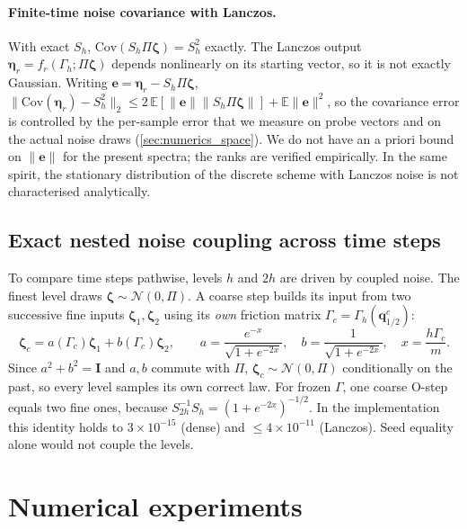 \documentclass[11pt]{article}
\DeclareRobustCommand{\_}{\textunderscore\allowbreak}
\theoremstyle{remark}
\theoremstyle{definition}
\newcommand{\bq}{\mathbf{q}}
\newcommand{\Id}{\mathbf{I}}
\newcommand{\Gh}{\Gamma_h}
\begin{document}
\paragraph{Finite-time noise covariance with Lanczos.}
With exact $S_h$, $\mathrm{Cov}(S_h\Pi\boldsymbol\zeta)=S_h^2$ exactly. The Lanczos output
$\boldsymbol\eta_r=f_r(\Gh;\Pi\boldsymbol\zeta)$ depends nonlinearly on its starting vector, so it is not exactly Gaussian.
Writing $\mathbf e=\boldsymbol\eta_r-S_h\Pi\boldsymbol\zeta$,
$\|\mathrm{Cov}(\boldsymbol\eta_r)-S_h^2\|_2\le2\,\mathbb E[\|\mathbf e\|\|S_h\Pi\boldsymbol\zeta\|]+\mathbb E\|\mathbf e\|^2$,
so the covariance error is controlled by the per-sample error that we measure on probe vectors and on the actual
noise draws (\cref{sec:numerics_space}). We do not have an a priori bound on $\|\mathbf e\|$ for the present spectra;
the ranks are verified empirically. In the same spirit, the stationary distribution of the discrete scheme with
Lanczos noise is not characterised analytically.

\subsection{Exact nested noise coupling across time steps}\label{sec:coupling}

To compare time steps pathwise, levels $h$ and $2h$ are driven by coupled noise. The finest level draws
$\boldsymbol\zeta\sim\mathcal N(0,\Pi)$. A coarse step builds its input from two successive fine inputs
$\boldsymbol\zeta_1,\boldsymbol\zeta_2$ using its \emph{own} friction matrix $\Gamma_c=\Gh(\bq^{c}_{1/2})$:
\begin{equation}\label{eq:coupling}
\boldsymbol\zeta_c=a(\Gamma_c)\boldsymbol\zeta_1+b(\Gamma_c)\boldsymbol\zeta_2,\qquad
a=\frac{e^{-x}}{\sqrt{1+e^{-2x}}},\quad b=\frac{1}{\sqrt{1+e^{-2x}}},\quad x=\frac{h\Gamma_c}{m}.
\end{equation}
Since $a^2+b^2=\Id$ and $a,b$ commute with $\Pi$, $\boldsymbol\zeta_c\sim\mathcal N(0,\Pi)$ conditionally on the past,
so every level samples its own correct law. For frozen $\Gamma$, one coarse O-step equals two fine ones, because
$S_{2h}^{-1}S_h=(1+e^{-2x})^{-1/2}$. In the implementation this identity holds to $3\times10^{-15}$ (dense) and
$\le4\times10^{-11}$ (Lanczos). Seed equality alone would not couple the levels.

\section{Numerical experiments}\label{sec:numerics}
\end{document}
